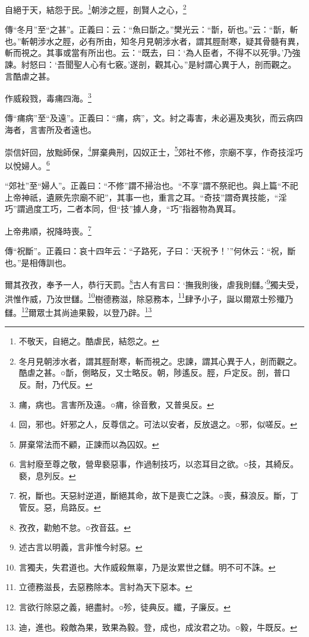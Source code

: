 自絕于天，結怨于民。\footnote{不敬天，自絕之。酷虐民，結怨之。}朝涉之脛，剖賢人之心，\footnote{冬月見朝涉水者，謂其脛耐寒，斬而視之。忠諫，謂其心異于人，剖而觀之。酷虐之甚。○斮，側略反，又士略反。朝，陟遙反。脛，戶定反。剖，普口反。耐，乃代反。}

{\noindent\zhuan{}\fzbyks 傳“冬月”至“之甚”。正義曰：云：“魚曰斮之。”樊光云：“斮，斫也。”云：“斮，斬也。”斬朝涉水之脛，必有所由，知冬月見朝涉水者，謂其脛耐寒，疑其骨髓有異，斬而視之。其事或當有所出也。云：“既去，曰：‘為人臣者，不得不以死爭。’乃強諫。紂怒曰：‘吾聞聖人心有七竅。’遂剖，觀其心。”是紂謂心異于人，剖而觀之。言酷虐之甚。 \par}

作威殺戮，毒痡四海。\footnote{痡，病也。言害所及遠。○痡，徐音敷，又普吳反。}

{\noindent\zhuan{}\fzbyks 傳“痡病”至“及遠”。正義曰：“痡，病”，文。紂之毒害，未必遍及夷狄，而云病四海者，言害所及者遠也。 \par}

崇信奸回，放黜師保，\footnote{回，邪也。奸邪之人，反尊信之。可法以安者，反放退之。○邪，似嗟反。}屏棄典刑，囚奴正士，\footnote{屏棄常法而不顧，正諫而以為囚奴。}郊社不修，宗廟不享，作奇技淫巧以悅婦人。\footnote{言紂廢至尊之敬，營卑褻惡事，作過制技巧，以恣耳目之欲。○技，其綺反。褻，息列反。}

{\noindent\shu{}\fzkt “郊社”至“婦人”。正義曰：“不修”謂不掃治也。“不享”謂不祭祀也。與上篇“不祀上帝神祇，遺厥先宗廟不祀”，其事一也，重言之耳。“奇技”謂奇異技能，“淫巧”謂過度工巧，二者本同，但“技”據人身，“巧”指器物為異耳。 \par}

上帝弗順，祝降時喪。\footnote{祝，斷也。天惡紂逆道，斷絕其命，故下是喪亡之誅。○喪，蘇浪反。斷，丁管反。惡，烏路反。}

{\noindent\zhuan{}\fzbyks 傳“祝斷”。正義曰：哀十四年云：“子路死，子曰：‘天祝予！’”何休云：“祝，斷也。”是相傳訓也。 \par}

爾其孜孜，奉予一人，恭行天罰。\footnote{孜孜，勸勉不怠。○孜音茲。}古人有言曰：‘撫我則後，虐我則讎。’\footnote{述古言以明義，言非惟今紂惡。}獨夫受，洪惟作威，乃汝世讎。\footnote{言獨夫，失君道也。大作威殺無辜，乃是汝累世之讎。明不可不誅。}樹德務滋，除惡務本，\footnote{立德務滋長，去惡務除本。言紂為天下惡本。}肆予小子，誕以爾眾士殄殲乃讎。\footnote{言欲行除惡之義，絕盡紂。○殄，徒典反。纖，子廉反。}爾眾士其尚迪果毅，以登乃辟。\footnote{迪，進也。殺敵為果，致果為毅。登，成也，成汝君之功。○毅，牛既反。}

